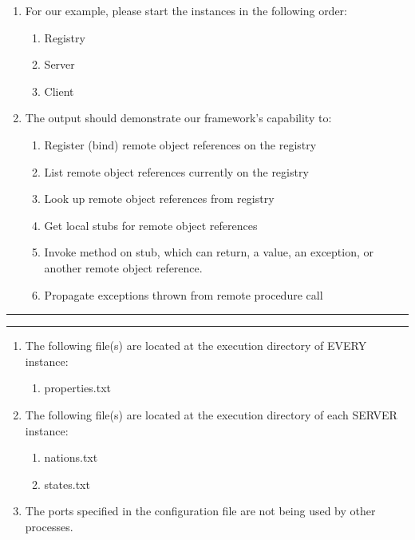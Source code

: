 \documentclass[11pt,letterpaper]{article}
\newcommand{\h}[1]
                    {\vspace{.25in} \hrule\vspace{0.5em}
                    \noindent{\bf #1 \vspace{0.5em}}
                    \hrule \vspace{.10in}
                    }
\begin{document}
\begin{enumerate}[1)]
\item For our example, please start the instances in the following order:
\begin{enumerate}
\item Registry
\item Server
\item Client
\end{enumerate}
	

\item The output should demonstrate our framework's capability to:
\begin{enumerate}[i]
\item Register (bind) remote object references on the registry
\item List remote object references currently on the registry
\item Look up remote object references from registry
\item Get local stubs for remote object references
\item Invoke method on stub, which can return, a value, an exception,
	   or another remote object reference.
\item Propagate exceptions thrown from remote procedure call
\end{enumerate}

\end{enumerate}

\h{Assumptions}

\begin{enumerate}
\item The following file(s) are located at the execution directory of EVERY instance:
\begin{enumerate}
\item properties.txt
\end{enumerate}

\item The following file(s) are located at the execution directory of each SERVER instance:
\begin{enumerate}
\item nations.txt
\item states.txt
\end{enumerate}
	
\item The ports specified in the configuration file are not being used by other processes.

\end{enumerate}
\end{document}
